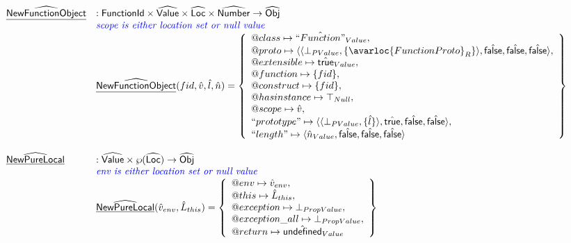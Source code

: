 \[\begin{array}{ll}
\ahf{NewFunctionObject} & : \fid \times \abs{Value} \times \aLoc \times \abs{Number} \rightarrow \aObj \\
& \comment{\inblue scope is either location set or null value} \\
& \ahf{NewFunctionObject}(fid,\hat{v},\hat{l},\hat{n}) = \set{
  \varprop{class}\mapsto \hat{``Function"}_{Value},\\
  \varprop{proto}\mapsto
    \langle\langle\bot_{PValue},\{\avarloc{FunctionProto}_R\}\rangle,\afalse,\afalse,\afalse\rangle,\\
  \varprop{extensible}\mapsto \atrue_{Value},\\
  \varprop{function}\mapsto \{fid\},\\
  \varprop{construct}\mapsto \{fid\},\\
  \varprop{hasinstance}\mapsto \top_{Null},\\
  \varprop{scope}\mapsto \hat{v},\\
  ``prototype"\mapsto
    \langle\langle\bot_{PValue},\{\hat{l}\}\rangle,\atrue,\afalse,\afalse\rangle,\\
  ``length"\mapsto
    \langle\hat{n}_{Value},\afalse,\afalse,\afalse\rangle
}\\\\


\ahf{NewPureLocal} & : \abs{Value} \times \powerset{\abs{Loc}} \rightarrow \aObj \\
& \comment{\inblue env is either location set or null value} \\
& \ahf{NewPureLocal}(\hat{v}_{env}, \hat{L}_{this}) = \set{
    \varprop{env} \mapsto \hat{v}_{env}, \\
    \varprop{this} \mapsto \hat{L}_{this}, \\
    \varprop{exception} \mapsto \bot_{PropValue}, \\
    \varprop{exception\_all} \mapsto \bot_{PropValue}, \\
    \varprop{return} \mapsto \aundef_{Value} 
}\\
\end{array}
\]
\\

